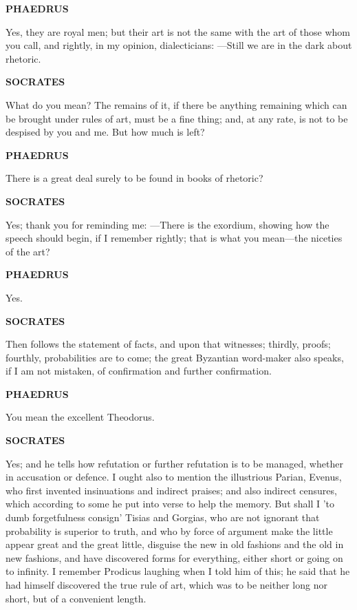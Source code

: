 \documentclass[11pt,letter]{article}
\begin{document}
\par \textbf{PHAEDRUS}
\par   Yes, they are royal men; but their art is not the same with the art of those whom you call, and rightly, in my opinion, dialecticians: —Still we are in the dark about rhetoric.

\par \textbf{SOCRATES}
\par   What do you mean? The remains of it, if there be anything remaining which can be brought under rules of art, must be a fine thing; and, at any rate, is not to be despised by you and me. But how much is left?

\par \textbf{PHAEDRUS}
\par   There is a great deal surely to be found in books of rhetoric?

\par \textbf{SOCRATES}
\par   Yes; thank you for reminding me: —There is the exordium, showing how the speech should begin, if I remember rightly; that is what you mean—the niceties of the art?

\par \textbf{PHAEDRUS}
\par   Yes.

\par \textbf{SOCRATES}
\par   Then follows the statement of facts, and upon that witnesses; thirdly, proofs; fourthly, probabilities are to come; the great Byzantian word-maker also speaks, if I am not mistaken, of confirmation and further confirmation.

\par \textbf{PHAEDRUS}
\par   You mean the excellent Theodorus.

\par \textbf{SOCRATES}
\par   Yes; and he tells how refutation or further refutation is to be managed, whether in accusation or defence. I ought also to mention the illustrious Parian, Evenus, who first invented insinuations and indirect praises; and also indirect censures, which according to some he put into verse to help the memory. But shall I 'to dumb forgetfulness consign' Tisias and Gorgias, who are not ignorant that probability is superior to truth, and who by force of argument make the little appear great and the great little, disguise the new in old fashions and the old in new fashions, and have discovered forms for everything, either short or going on to infinity. I remember Prodicus laughing when I told him of this; he said that he had himself discovered the true rule of art, which was to be neither long nor short, but of a convenient length.
\end{document}
